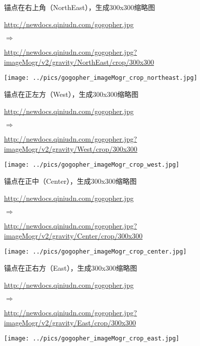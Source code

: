 \documentclass[11pt, oneside]{book}
\newcommand{\qsym}[1]{
\footnotesize
\noindent
#1\par
\normalsize
}
\newcommand{\qsamplelink}[1]{
\vspace{0.2em}
\noindent
#1\par
\vspace{0.1em}
}
\newcommand{\qurl}[1]{\footnotesize\url{#1}\normalsize}
\begin{document}
\begin{sample}
  \caption{锚点在右上角（NorthEast），生成300x300缩略图}
    \qsamplelink{\qurl{http://newdocs.qiniudn.com/gogopher.jpg}}
    \qsym{$\Rightarrow$}
    \qsamplelink{\qurl{http://newdocs.qiniudn.com/gogopher.jpg?imageMogr/v2/gravity/NorthEast/crop/300x300}}

    \begin{center}
      \texttt{[image: ../pics/gogopher\_imageMogr\_crop\_northeast.jpg]}
    \end{center}
  \label{imageMogr-crop-northeast}
\end{sample}

\begin{sample}
  \caption{锚点在正左方（West），生成300x300缩略图}
    \qsamplelink{\qurl{http://newdocs.qiniudn.com/gogopher.jpg}}
    \qsym{$\Rightarrow$}
    \qsamplelink{\qurl{http://newdocs.qiniudn.com/gogopher.jpg?imageMogr/v2/gravity/West/crop/300x300}}

    \begin{center}
      \texttt{[image: ../pics/gogopher\_imageMogr\_crop\_west.jpg]}
    \end{center}
  \label{imageMogr-crop-west}
\end{sample}

\begin{sample}
  \caption{锚点在正中（Center），生成300x300缩略图}
    \qsamplelink{\qurl{http://newdocs.qiniudn.com/gogopher.jpg}}
    \qsym{$\Rightarrow$}
    \qsamplelink{\qurl{http://newdocs.qiniudn.com/gogopher.jpg?imageMogr/v2/gravity/Center/crop/300x300}}

    \begin{center}
      \texttt{[image: ../pics/gogopher\_imageMogr\_crop\_center.jpg]}
    \end{center}
  \label{imageMogr-crop-center}
\end{sample}

\begin{sample}
  \caption{锚点在正右方（East），生成300x300缩略图}
    \qsamplelink{\qurl{http://newdocs.qiniudn.com/gogopher.jpg}}
    \qsym{$\Rightarrow$}
    \qsamplelink{\qurl{http://newdocs.qiniudn.com/gogopher.jpg?imageMogr/v2/gravity/East/crop/300x300}}

    \begin{center}
      \texttt{[image: ../pics/gogopher\_imageMogr\_crop\_east.jpg]}
    \end{center}
  \label{imageMogr-crop-east}
\end{sample}
\end{document}
